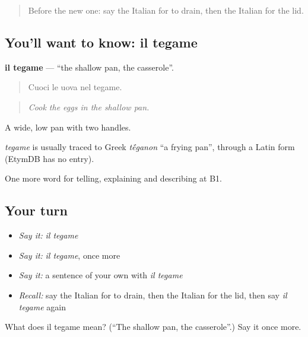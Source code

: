 \label{lesson:IT-C333-tegame}



\begin{quote}
Before the new one: say the Italian for to drain, then the Italian for the lid.
\end{quote}

\subsection*{You'll want to know: il tegame}
\textbf{il tegame} — \textquotedblleft{}the shallow pan, the casserole\textquotedblright{}.

\begin{quote}
Cuoci le uova nel tegame.
\end{quote}

\begin{quote}
\emph{Cook the eggs in the shallow pan.}
\end{quote}

A wide, low pan with two handles.

\begin{cousinweb}
\emph{tegame} is usually traced to Greek \emph{t\'{\={e}}ganon} \textquotedblleft{}a frying pan\textquotedblright{}, through a Latin form (EtymDB has no entry).
\end{cousinweb}

\begin{grammarlens}[title={What you've built}]
One more word for telling, explaining and describing at B1.
\end{grammarlens}

\subsection*{Your turn}
\begin{itemize}
\raggedright
  \item \emph{Say it:} \emph{il tegame}
  \item \emph{Say it:} \emph{il tegame}, once more
  \item \emph{Say it:} a sentence of your own with \emph{il tegame}
  \item \emph{Recall:} say the Italian for to drain, then the Italian for the lid, then say \emph{il tegame} again
\end{itemize}

\begin{tcolorbox}[breakable,colback=teal!4,colframe=teal!35!black,title={Before you move on}]
What does il tegame mean? (\textquotedblleft{}The shallow pan, the casserole\textquotedblright{}.) Say it once more.
\end{tcolorbox}
